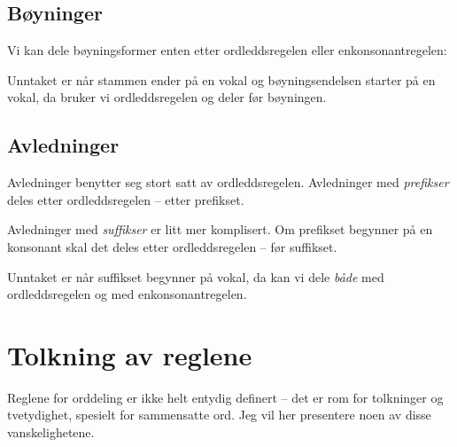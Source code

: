 \newline
{}\newline
{}\newline
{}\newline
{}\newline
{}

\subsection{Bøyninger}

Vi kan dele bøyningsformer enten etter ordleddsregelen eller enkonsonantregelen:

\newline
{}

Unntaket er når stammen ender på en vokal og bøyningsendelsen starter på en vokal, da bruker vi ordleddsregelen og deler før bøyningen.


\subsection{Avledninger}

Avledninger benytter seg stort satt av ordleddsregelen. Avledninger med \textit{prefikser} deles etter ordleddsregelen -- etter prefikset.


Avledninger med \textit{suffikser} er litt mer komplisert. Om prefikset begynner på en konsonant skal det deles etter ordleddsregelen -- før suffikset.


Unntaket er når suffikset begynner på vokal, da kan vi dele \textit{både} med ordleddsregelen og med enkonsonantregelen.

\newline 
{}

\section{Tolkning av reglene}

Reglene for orddeling er ikke helt entydig definert -- det er rom for tolkninger og tvetydighet, spesielt for sammensatte ord. Jeg vil her presentere noen av disse vanskelighetene.

